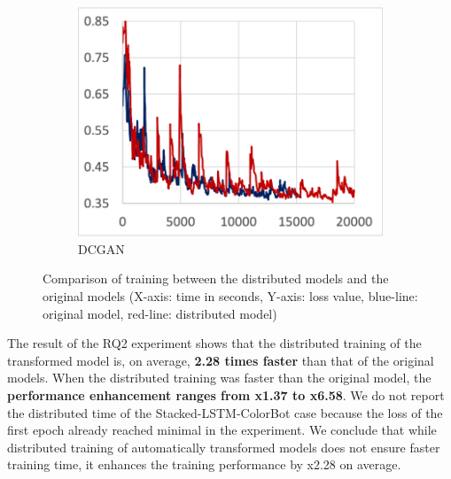 \begin{figure}[!ht]
  \begin{subfigure}[t]{.22\textwidth}
    \includegraphics[width=\textwidth]{tf2-13}
    \caption{\footnotesize DCGAN}
  \end{subfigure} 

  \caption{Comparison of training between the distributed models and the
  original models (X-axis: time in seconds, Y-axis: loss value, blue-line:
  original model, red-line: distributed model)}
  \label{fig:eval:train}
\end{figure}

\begin{inred}
The result of the RQ2 experiment shows that the distributed training of the 
transformed model is, on average, 
\textbf{2.28 times faster} than that of the original models.
When the distributed training was faster than the original model,
the \textbf{performance enhancement ranges from x1.37 to x6.58}.
We do not report the distributed time of the Stacked-LSTM-ColorBot case
because the loss of the first epoch already reached minimal in the experiment.
We conclude that while distributed training of automatically transformed models
does not ensure faster training time,
it enhances the training performance by x2.28 on average.
\end{inred}

